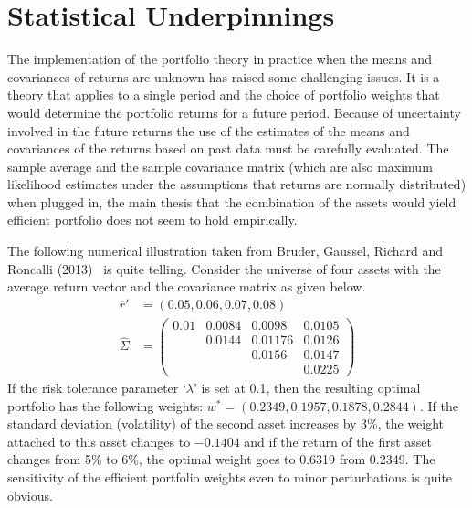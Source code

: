 \section{Statistical Underpinnings \label{s:stat_under}}

The implementation of the portfolio theory in practice when the means and covariances of returns are unknown has raised some challenging issues. It is a theory that applies to a single period and the choice of portfolio weights that would determine the portfolio returns for a future period. Because of uncertainty involved in the future returns the use of the estimates of the means and covariances of the returns based on past data must be carefully evaluated. The sample average and the sample covariance matrix (which are also maximum likelihood estimates under the assumptions that returns are normally distributed) when plugged in, the main thesis that the combination of the assets would yield efficient portfolio does not seem to hold empirically. 


The following numerical illustration taken from Bruder, Gaussel, Richard and Roncalli (2013)~\cite{bruder} is quite telling. Consider the universe of four assets with the average return vector and the covariance matrix as given below.
	\begin{equation} \label{eqn:ovrsighat}
	\begin{split}
	\overline{r}'&= (0.05, 0.06, 0.07, 0.08) \\
	\hat{\Sigma}&=\begin{pmatrix}
	0.01 & 0.0084 & 0.0098 & 0.0105 \\
	        & 0.0144 & 0.01176 & 0.0126 \\
	        &             & 0.0156 & 0.0147 \\
	        &             &             & 0.0225
	\end{pmatrix}
	\end{split}
	\end{equation}
If the risk tolerance parameter `$\lambda$' is set at 0.1, then the resulting optimal portfolio has the following weights: $w^*= (0.2349, 0.1957, 0.1878, 0.2844)$. If the standard deviation (volatility) of the second asset increases by 3\%, the weight attached to this asset changes to $-0.1404$ and if the return of the first asset changes from 5\% to 6\%, the optimal weight goes to 0.6319 from 0.2349. The sensitivity of the efficient portfolio weights even to minor perturbations is quite obvious. 


